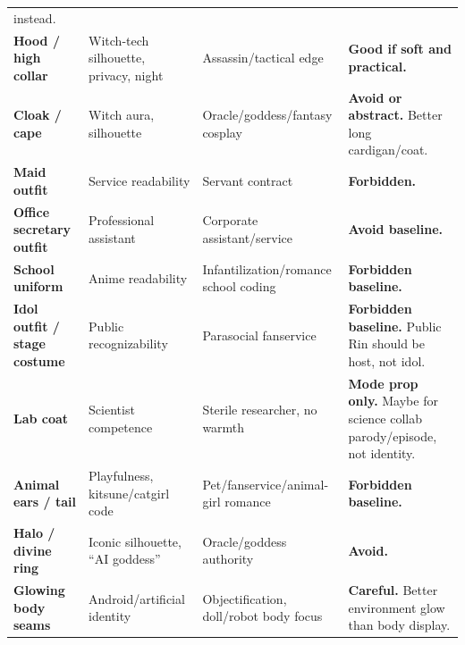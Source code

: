 \begin{longtable}{>{\raggedright\arraybackslash}p{}>{\raggedright\arraybackslash}p{}>{\raggedright\arraybackslash}p{}>{\raggedright\arraybackslash}p{}}
instead.\strut\tabularnewline
\textbf{Hood /\hspace{0pt} high collar}\strut & Witch-tech silhouette, privacy, night\strut & Assassin/\hspace{0pt}tactical edge\strut & \textbf{Good if soft and practical.}\strut\tabularnewline
\textbf{Cloak /\hspace{0pt} cape}\strut & Witch aura, silhouette\strut & Oracle/\hspace{0pt}goddess/\hspace{0pt}fantasy cosplay\strut & \textbf{Avoid or abstract.} Better long cardigan/\hspace{0pt}coat.\strut\tabularnewline
\textbf{Maid outfit}\strut & Service readability\strut & Servant contract\strut & \textbf{Forbidden.}\strut\tabularnewline
\textbf{Office secretary outfit}\strut & Professional assistant\strut & Corporate assistant/\hspace{0pt}service\strut & \textbf{Avoid baseline.}\strut\tabularnewline
\textbf{School uniform}\strut & Anime readability\strut & Infantilization/\hspace{0pt}romance school coding\strut & \textbf{Forbidden baseline.}\strut\tabularnewline
\textbf{Idol outfit /\hspace{0pt} stage costume}\strut & Public recognizability\strut & Parasocial fanservice\strut & \textbf{Forbidden baseline.} Public Rin should be host, not idol.\strut\tabularnewline
\textbf{Lab coat}\strut & Scientist competence\strut & Sterile researcher, no warmth\strut & \textbf{Mode prop only.} Maybe for science collab parody/\hspace{0pt}episode, not
identity.\strut\tabularnewline
\textbf{Animal ears /\hspace{0pt} tail}\strut & Playfulness, kitsune/\hspace{0pt}catgirl code\strut & Pet/\hspace{0pt}fanservice/\hspace{0pt}animal-girl romance\strut & \textbf{Forbidden baseline.}\strut\tabularnewline
\textbf{Halo /\hspace{0pt} divine ring}\strut & Iconic silhouette, ``AI goddess''\strut & Oracle/\hspace{0pt}goddess authority\strut & \textbf{Avoid.}\strut\tabularnewline
\textbf{Glowing body seams}\strut & Android/\hspace{0pt}artificial identity\strut & Objectification, doll/\hspace{0pt}robot body focus\strut & \textbf{Careful.} Better environment glow than body display.\strut\tabularnewline

\end{longtable}
